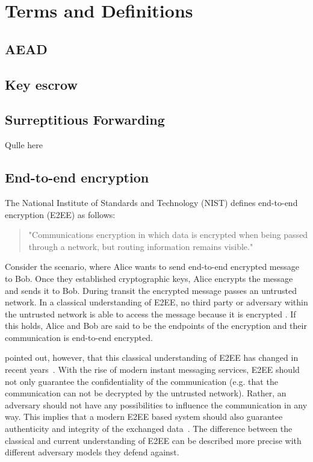 \documentclass[../main.tex]{subfiles}
\begin{document}
\chapter{Terms and Definitions}
\section{AEAD}

\section{Key escrow}

\section{Surreptitious Forwarding}
Qulle here~\cite{Davis2001}

\section{End-to-end encryption} 
\label{sec:end-to-end}

The National Institute of Standards and Technology (NIST) defines end-to-end encryption (E2EE) as follows:
\begin{quote}
"Communications encryption in which data is encrypted when being passed through a network, but routing information remains visible."~\cite[88]{Nieles2017}
\end{quote}
Consider the scenario, where Alice wants to send end-to-end encrypted message to Bob.
Once they established cryptographic keys, Alice encrypts the message and sends it to Bob.
During transit the encrypted message passes an untrusted network.
In a classical understanding of E2EE, no third party or adversary within the untrusted network is able to access the message because it is encrypted \cite{Ermoshina2016}.
If this holds, Alice and Bob are said to be the endpoints of the encryption and their communication is end-to-end encrypted.

\citeauthor{Hale2022} pointed out, however, that this classical understanding of E2EE has changed in recent years~\cite{Hale2022}. 
With the rise of modern instant messaging services, E2EE should not only guarantee the confidentiality of the communication (e.g. that the communication can not be decrypted by the untrusted network).
Rather, an adversary should not have any possibilities to influence the communication in any way.
This implies that a modern E2EE based system should also guarantee authenticity and integrity of the exchanged data~\cite{Hale2022}. 
The difference between the classical and current understanding of E2EE can be described more precise with different adversary models they defend against.
\end{document}
